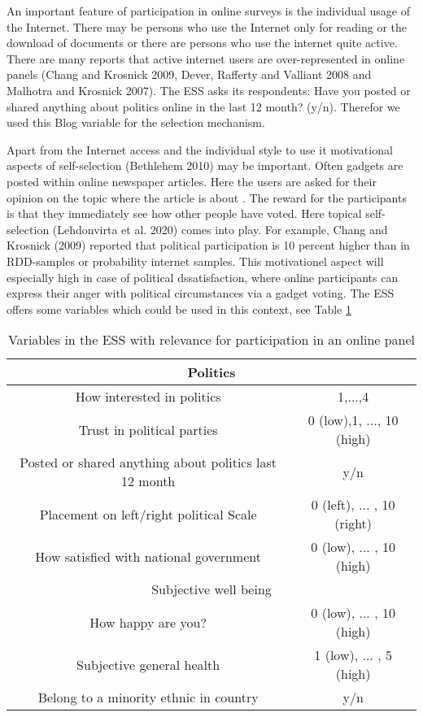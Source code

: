 \documentclass[a4paper , 11pt]{article}
\begin{document}
 An important feature of participation in online surveys is the individual usage of the Internet. There may be persons who use  the Internet only for reading or the download of documents or there are persons who use the internet quite active. There are many reports that active internet users are over-represented in online panels (Chang and Krosnick 2009, Dever, Rafferty and Valliant 2008 and Malhotra and Krosnick 2007). The ESS asks its respondents: Have you posted or shared anything about politics online in the last 12 month? (y/n). Therefor we used this Blog variable for the selection mechanism.  
 
 Apart from the Internet access and the individual style to use it motivational aspects of self-selection (Bethlehem 2010) may be important. Often gadgets are posted within online newspaper articles. Here the users are asked for their opinion on the topic where the article is about . The reward  for the participants is that they immediately see how other people have voted. Here topical self-selection (Lehdonvirta et al. 2020) comes into play. For example, Chang and Krosnick (2009) reported that political participation is 10 percent higher than in RDD-samples or probability internet samples. This motivationel aspect will especially high in case of political dssatisfaction, where online participants can express their anger with political circumstances via a gadget voting. The ESS offers some variables which could be used in this context, see Table \ref{tab:Selection_vars}
 
 \begin{table}[h]
\centering
\caption{Variables in the ESS with relevance for participation in an online panel}
\label{tab:Selection_vars}
\begin{tabular}{|c|c|}
\hline
\multicolumn{2}{|c|}{Politics}  \\ \hline
How interested in politics &  1,...,4  \\
Trust in political parties &  0 (low),1, ..., 10 (high) \\
Posted or shared anything about politics last 12 month & y/n \\
Placement on left/right  political Scale & 0 (left), ... , 10 (right) \\
How satisfied with national government & 0 (low), ... , 10 (high) \\
\hline
\multicolumn{2}{|c|}{Subjective well being}  \\ \hline
How happy are you? & 0 (low), ... , 10 (high) \\
Subjective general health & 1 (low), ... , 5 (high) \\
Belong to a minority ethnic in country & y/n \\
\hline
\end{tabular}
\end{table} 
\end{document}

